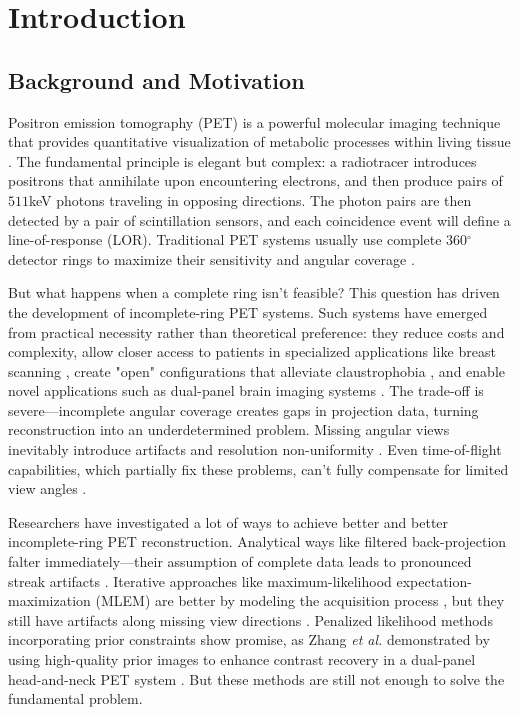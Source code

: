 \documentclass[
reprint,
superscriptaddress,
nofootinbib,
amsmath,amssymb,
aps,
prd,
]{revtex4-2}
\begin{document}

\section{Introduction}
\label{chap:introduction}

\subsection{Background and Motivation}

Positron emission tomography (PET) is a powerful molecular imaging technique that provides quantitative visualization of metabolic processes within living tissue \cite{townsend2004}. The fundamental principle is elegant but complex: a radiotracer introduces positrons that annihilate upon encountering electrons, and then produce pairs of $511$keV photons traveling in opposing directions. 
The photon pairs are then detected by a pair of scintillation sensors, and each coincidence event will define a line-of-response (LOR).
Traditional PET systems usually use complete 360$^\circ$ detector rings to maximize their sensitivity and angular coverage \cite{townsend2004}.

But what happens when a complete ring isn't feasible? This question has driven the development of incomplete-ring PET systems. Such systems have emerged from practical necessity rather than theoretical preference: they reduce costs and complexity, allow closer access to patients in specialized applications like breast scanning \cite{surti2008}, create "open" configurations that alleviate claustrophobia \cite{tashima2012, krishnamoorthy2021}, and enable novel applications such as dual-panel brain imaging systems \cite{zhang2020}. The trade-off is severe—incomplete angular coverage creates gaps in projection data, turning reconstruction into an underdetermined problem. Missing angular views inevitably introduce artifacts and resolution non-uniformity \cite{kak1988, surti2008}. Even time-of-flight capabilities, which partially fix these problems, can't fully compensate for limited view angles \cite{surti2008, krishnamoorthy2021}.

Researchers have investigated a lot of ways to achieve better and better incomplete-ring PET reconstruction. Analytical ways like filtered back-projection falter immediately—their assumption of complete data leads to pronounced streak artifacts \cite{kak1988}. Iterative approaches like maximum-likelihood expectation-maximization (MLEM) are better by modeling the acquisition process \cite{qi2006}, but they still have artifacts along missing view directions \cite{zhang2020}.
Penalized likelihood methods incorporating prior constraints show promise, as Zhang \textit{et al.} demonstrated by using high-quality prior images to enhance contrast recovery in a dual-panel head-and-neck PET system \cite{zhang2020}. But these methods are still not enough to solve the fundamental problem.
\end{document}
